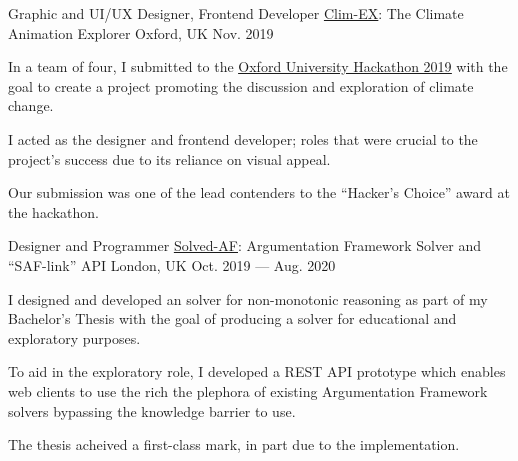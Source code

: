 \begin{cventries}
    \cventry
    {Graphic and UI/UX Designer, Frontend Developer} %
    {\href{https://github.com/davzzar/clim-EX}{\uline{Clim-EX}}: The Climate Animation Explorer} %
    {Oxford, UK} %
    {Nov. 2019} %
    {
        \begin{cvitems}
        \item In a team of four, I submitted to the \href{http://www.ox.ac.uk/students/news/2019-10-14-oxford-hack-2019}{\uline{Oxford University Hackathon 2019}} with the goal to create a project promoting the discussion and exploration of climate change.
        \item I acted as the designer and frontend developer; roles that were crucial to the project's success due to its reliance on visual appeal.
        \item Our submission was one of the lead contenders to the ``Hacker's Choice'' award at the hackathon.
        \end{cvitems}
    }

    \cventry
    {Designer and Programmer} %
    {\href{https://github.com/davzzar/solved-af}{\uline{Solved-AF}}: Argumentation Framework Solver and ``SAF-link'' API} %
    {London, UK} %
    {Oct. 2019 --- Aug. 2020} %
    {
        \begin{cvitems}
            \item I designed and developed an \href{https://www.sciencedirect.com/science/article/pii/000437029400041X}{} solver for non-monotonic reasoning as part of my Bachelor's Thesis with the goal of producing a solver for educational and exploratory purposes.
            \item To aid in the exploratory role, I developed a REST API prototype which enables web clients to use the rich the plephora of existing Argumentation Framework solvers bypassing the knowledge barrier to use. 
            \item The thesis acheived a first-class mark, in part due to the implementation.
        \end{cvitems}
    }

\end{cventries}

